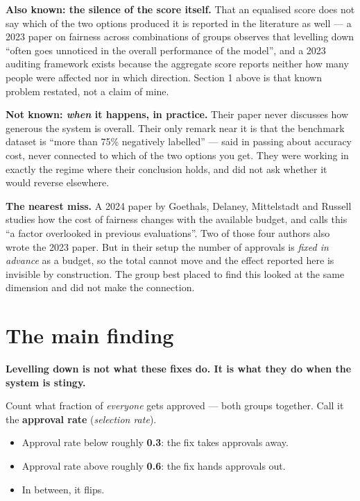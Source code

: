 \documentclass[11pt,a4paper]{article}
\newcommand{\jargon}[1]{\emph{#1}}
\begin{document}
\textbf{Also known: the silence of the score itself.} That an equalised score does not say
which of the two options produced it is reported in the literature as well --- a 2023 paper
on fairness across combinations of groups observes that levelling down ``often goes unnoticed
in the overall performance of the model'', and a 2023 auditing framework exists because the
aggregate score reports neither how many people were affected nor in which direction. Section
1 above is that known problem restated, not a claim of mine.

\textbf{Not known: \emph{when} it happens, in practice.} Their paper never discusses how generous the
system is overall. Their only remark near it is that the benchmark dataset is ``more than
75\% negatively labelled'' --- said in passing about accuracy cost, never connected to which
of the two options you get. They were working in exactly the regime where their conclusion
holds, and did not ask whether it would reverse elsewhere.

\textbf{The nearest miss.} A 2024 paper by Goethals, Delaney, Mittelstadt and Russell studies
how the cost of fairness changes with the available budget, and calls this ``a factor
overlooked in previous evaluations''. Two of those four authors also wrote the 2023 paper.
But in their setup the number of approvals is \emph{fixed in advance} as a budget, so the
total cannot move and the effect reported here is invisible by construction. The group best
placed to find this looked at the same dimension and did not make the connection.

\section{The main finding}

\textbf{Levelling down is not what these fixes do. It is what they do when the system is
stingy.}

Count what fraction of \emph{everyone} gets approved --- both groups together. Call it the
\textbf{approval rate} (\jargon{selection rate}).

\begin{itemize}
\item Approval rate below roughly \textbf{0.3}: the fix takes approvals away.
\item Approval rate above roughly \textbf{0.6}: the fix hands approvals out.
\item In between, it flips.
\end{itemize}
\end{document}
